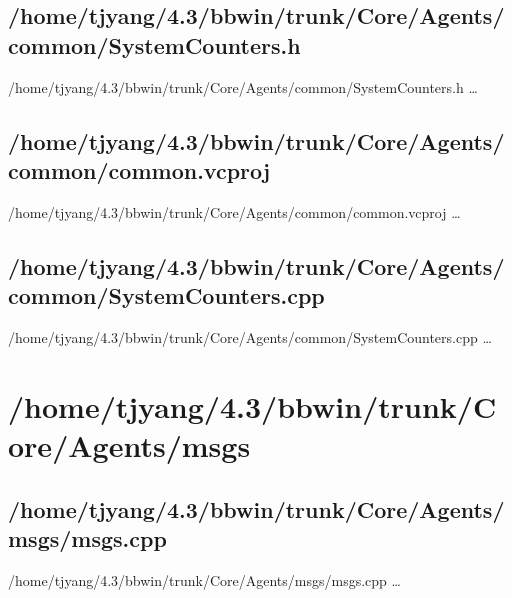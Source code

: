 \subsection{/home/tjyang/4.3/bbwin/trunk/Core/Agents/common/SystemCounters.h}
\lstset{numberstyle=\tiny,numbers=left,
   breaklines=true,
   stepnumber=1,numbersep=5pt,firstnumber=1,
   xleftmargin=12pt,showstringspaces=false}
\noindent /home/tjyang/4.3/bbwin/trunk/Core/Agents/common/SystemCounters.h  \ldots



\subsection{/home/tjyang/4.3/bbwin/trunk/Core/Agents/common/common.vcproj}
\lstset{numberstyle=\tiny,numbers=left,
   breaklines=true,
   stepnumber=1,numbersep=5pt,firstnumber=1,
   xleftmargin=12pt,showstringspaces=false}
\noindent /home/tjyang/4.3/bbwin/trunk/Core/Agents/common/common.vcproj  \ldots



\subsection{/home/tjyang/4.3/bbwin/trunk/Core/Agents/common/SystemCounters.cpp}
\lstset{numberstyle=\tiny,numbers=left,
   breaklines=true,
   stepnumber=1,numbersep=5pt,firstnumber=1,
   xleftmargin=12pt,showstringspaces=false}
\noindent /home/tjyang/4.3/bbwin/trunk/Core/Agents/common/SystemCounters.cpp  \ldots



\section{/home/tjyang/4.3/bbwin/trunk/Core/Agents/msgs}



\subsection{/home/tjyang/4.3/bbwin/trunk/Core/Agents/msgs/msgs.cpp}
\lstset{numberstyle=\tiny,numbers=left,
   breaklines=true,
   stepnumber=1,numbersep=5pt,firstnumber=1,
   xleftmargin=12pt,showstringspaces=false}
\noindent /home/tjyang/4.3/bbwin/trunk/Core/Agents/msgs/msgs.cpp  \ldots



